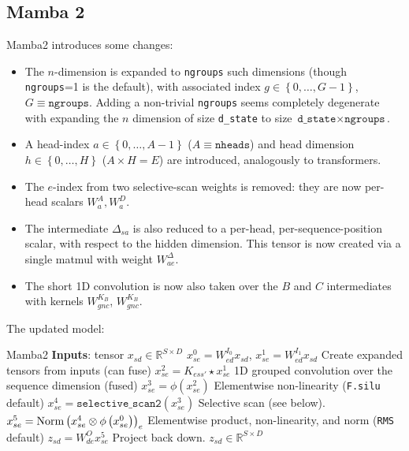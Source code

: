 \documentclass[11pt]{article}
\begin{document}
\subsection{Mamba 2}

Mamba2 introduces some changes:
\begin{itemize}
    \item The $ n $-dimension is expanded to \texttt{ngroups} such dimensions (though
        \texttt{ngroups}=1 is the default), with associated index $ g\in \left \{ 0, \ldots , G-1
        \right \} $, $ G \equiv  \texttt{ngroups} $. Adding a non-trivial \texttt{ngroups} seems
        completely degenerate with expanding the $ n $ dimension of size \texttt{d\_state} to size
        $\texttt{d\_state}\times \texttt{ngroups} $.
    \item A head-index $ a \in \left \{ 0, \ldots , A-1 \right \} $ ($ A \equiv  \texttt{nheads} $)
        and head dimension $ h \in \left \{ 0, \ldots , H \right \} $ ($ A\times H= E $) are
        introduced, analogously to transformers.
    \item The $ e $-index from two selective-scan weights is removed: they are now per-head scalars $
        W ^{ A }_{ a }, W ^{ D }_{ a } $.
    \item The intermediate $ \Delta _{ sa } $ is also reduced to a per-head, per-sequence-position
        scalar, with respect to the hidden dimension. This tensor is now created via a single matmul
        with weight $ W ^{ \Delta }_{ ae } $.
    \item The short 1D convolution is now also taken over the $ B $ and $ C $ intermediates with
        kernels $W ^{ K _{ B } }_{ gnc } $, $ W ^{ K _{ B } }_{ gnc } $.
\end{itemize}

The updated model:
\begin{algo}{Mamba2}
\State \textbf{Inputs}: tensor $ x _{ sd }\in \mathbb{R}^{ S\times D } $
\State $ x ^{ 0 } _{ se } = W ^{ I _{ 0 } }_{ ed } x _{ sd }$, $ x ^{ 1 }  _{ se } = W ^{ I _{ 1 } }_{ ed } x _{ sd } $ \Comment Create expanded tensors from inputs (can fuse)
\State $ x ^{ 2 } _{ se } = K _{ ess' }\star x ^{ 1 }_{ se }$ \Comment 1D grouped convolution over the sequence dimension (fused)
\State $ x ^{ 3 } _{ se } = \phi \left ( x ^{ 2 }_{ se } \right )$ \Comment Elementwise non-linearity (\texttt{F.silu} default)
\State $ x ^{ 4 } _{ se } = \texttt{selective\_scan2} \left ( x ^{ 3 }_{ se } \right )$ \Comment Selective scan (see below).
\State $ x ^{ 5 } _{ se } = {\rm Norm }\left (x ^{ 4 }  _{ se }\otimes\phi \left ( x ^{ 0 }_{ se } \right )\right ) _{ e }$ \Comment Elementwise product, non-linearity, and norm (\texttt{RMS} default)
\State $ z _{ sd } = W ^{ O }_{ de }x ^{ 5 }_{ se }$ \Comment Project back down.
\State \Return $ z _{ sd } \in \mathbb{R}^{ S\times D }$
\label{algo_mamba_2}
\end{algo}
\end{document}
